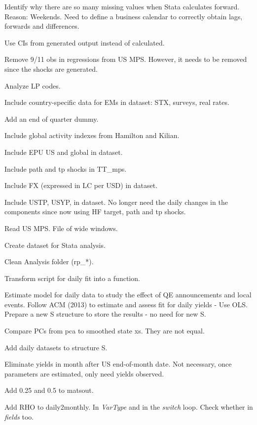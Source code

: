 \documentclass[12pt]{article}
\newcommand{\cmark}{\ding{51}}
\newcommand{\xmark}{\ding{55}}
\newcommand{\done}{\rlap{$\square$}{\raisebox{2pt}{\large\hspace{1pt}\cmark}}%
	\hspace{-2.5pt}}
\newcommand{\wontdo}{\rlap{$\square$}{\large\hspace{1pt}\xmark}}
\begin{document}
\begin{todolist}
	\item[\done] Identify why there are so many missing values when Stata calculates forward. Reason: Weekends. Need to define a business calendar to correctly obtain lags, forwards and differences.
	\item[\done] Use CIs from generated output instead of calculated.
	\item[\done] Remove 9/11 obs in regressions from US MPS. However, it needs to be removed since the shocks are generated.
	\item[\done] Analyze LP codes.
	\item[\done] Include country-specific data for EMs in dataset: STX, surveys, real rates.
	\item[\done] Add an end of quarter dummy.
	\item[\done] Include global activity indexes from Hamilton and Kilian.
	\item[\done] Include EPU US and global in dataset.
	\item[\done] Include path and tp shocks in TT_mps.
	\item[\done] Include FX (expressed in LC per USD) in dataset.
	\item[\wontdo] Include USTP, USYP, in dataset. No longer need the daily changes in the components since now using HF target, path and tp shocks.
	\item[\done] Read US MPS. File of wide windows.
	\item[\done] Create dataset for Stata analysis.
	\item[\done] Clean Analysis folder (rp_*).
	\item[\done] Transform script for daily fit into a function.
	\item[\done] Estimate model for daily data to study the effect of QE announcements and local events. Follow ACM (2013) to estimate and assess fit for daily yields - Use OLS. Prepare a new S structure to store the results - no need for new S.
	\item[\done] Compare PCs from pca to smoothed state xs. They are not equal.
	\item[\done] Add daily datasets to structure S.
	\item[\wontdo] Eliminate yields in month after US end-of-month date. Not necessary, once parameters are estimated, only need yields observed.
	\item[\done] Add 0.25 and 0.5 to matsout.
	\item[\done] Add RHO to daily2monthly. In \textit{VarType} and in the \textit{switch} loop. Check whether in \textit{fields} too.

\end{todolist}
\end{document}
